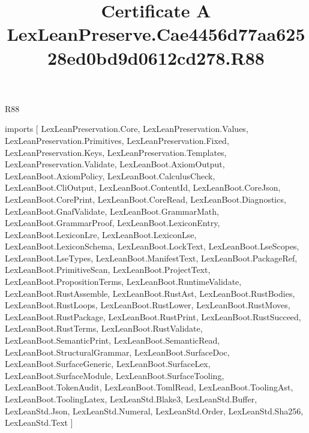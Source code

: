 \begin{lexlean}{R88}
\title{Certificate A LexLeanPreserve.Cae4456d77aa62528ed0bd9d0612cd278.R88}
\begin{coremodule}
imports [
  LexLeanPreservation.Core,
  LexLeanPreservation.Values,
  LexLeanPreservation.Primitives,
  LexLeanPreservation.Fixed,
  LexLeanPreservation.Keys,
  LexLeanPreservation.Templates,
  LexLeanPreservation.Validate,
  LexLeanBoot.AxiomOutput,
  LexLeanBoot.AxiomPolicy,
  LexLeanBoot.CalculusCheck,
  LexLeanBoot.CliOutput,
  LexLeanBoot.ContentId,
  LexLeanBoot.CoreJson,
  LexLeanBoot.CorePrint,
  LexLeanBoot.CoreRead,
  LexLeanBoot.Diagnostics,
  LexLeanBoot.GnafValidate,
  LexLeanBoot.GrammarMath,
  LexLeanBoot.GrammarProof,
  LexLeanBoot.LexiconEntry,
  LexLeanBoot.LexiconLre,
  LexLeanBoot.LexiconLse,
  LexLeanBoot.LexiconSchema,
  LexLeanBoot.LockText,
  LexLeanBoot.LseScopes,
  LexLeanBoot.LseTypes,
  LexLeanBoot.ManifestText,
  LexLeanBoot.PackageRef,
  LexLeanBoot.PrimitiveScan,
  LexLeanBoot.ProjectText,
  LexLeanBoot.PropositionTerms,
  LexLeanBoot.RuntimeValidate,
  LexLeanBoot.RustAssemble,
  LexLeanBoot.RustAst,
  LexLeanBoot.RustBodies,
  LexLeanBoot.RustLoops,
  LexLeanBoot.RustLower,
  LexLeanBoot.RustMoves,
  LexLeanBoot.RustPackage,
  LexLeanBoot.RustPrint,
  LexLeanBoot.RustSucceed,
  LexLeanBoot.RustTerms,
  LexLeanBoot.RustValidate,
  LexLeanBoot.SemanticPrint,
  LexLeanBoot.SemanticRead,
  LexLeanBoot.StructuralGrammar,
  LexLeanBoot.SurfaceDoc,
  LexLeanBoot.SurfaceGeneric,
  LexLeanBoot.SurfaceLex,
  LexLeanBoot.SurfaceModule,
  LexLeanBoot.SurfaceTooling,
  LexLeanBoot.TokenAudit,
  LexLeanBoot.TomlRead,
  LexLeanBoot.ToolingAst,
  LexLeanBoot.ToolingLatex,
  LexLeanStd.Blake3,
  LexLeanStd.Buffer,
  LexLeanStd.Json,
  LexLeanStd.Numeral,
  LexLeanStd.Order,
  LexLeanStd.Sha256,
  LexLeanStd.Text
]


\end{coremodule}
\end{lexlean}
